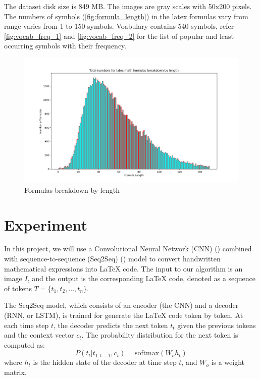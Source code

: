 \documentclass{article}
\begin{document}
 The dataset disk size is 849 MB. The images are gray scales with 50x200 pixels. The numbers of symbols (\autoref{fig:formula_length}) in the latex formulas vary from range varies from 1 to 150 symbols. Voabulary contains 540 symbols, refer \autoref{fig:vocab_freq_1} and \autoref{fig:vocab_freq_2} for the list of popular and least occurring symbols with their frequency.
 
\begin{figure}
    \centering
    \includegraphics[scale=0.4]{fig_latex_formula_length.png}
    \caption{Formulas breakdown by length}
    \label{fig:formula_length}
\end{figure}


\section{Experiment}

In this project, we will use a Convolutional Neural Network (CNN) (\cite{OSheaN15}) combined with sequence-to-sequence (Seq2Seq) (\cite{6795963}) model to convert handwritten mathematical expressions into LaTeX code. The input to our algorithm is an image  \( I \), and the output is the corresponding LaTeX code, denoted as a sequence of tokens \( T = \{t_1, t_2, \dots, t_n\} \).

The Seq2Seq model, which consists of an encoder (the CNN) and a decoder (RNN, or LSTM), is trained for generate the LaTeX code token by token. At each time step \( t \), the decoder predicts the next token \( t_t \) given the previous tokens and the context vector \( c_t \). The probability distribution for the next token is computed as:
\[
P(t_t | t_{1:t-1}, c_t) = \text{softmax}(W_o h_t)
\]
where \( h_t \) is the hidden state of the decoder at time step \( t \), and \( W_o \) is a weight matrix.
\end{document}
